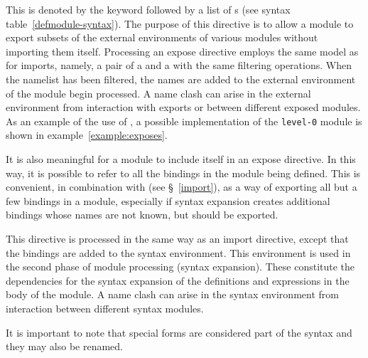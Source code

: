 \begin{optDefinition}
%
This is denoted by the keyword  followed by a list of
s (see syntax table~\ref{defmodule-syntax}).  The
purpose of this directive is to allow a module to export subsets of the external
environments of various modules without importing them itself.  Processing an
expose directive employs the same model as for imports, namely, a pair of a
 and a  with the same filtering operations.
When the namelist has been filtered, the names are added to the external
environment of the module begin processed.  A name clash can arise in the
external environment from interaction with exports or between different exposed
modules.  As an example of the use of , a possible
implementation of the {\tt level-0} module is shown in
example~\ref{example:exposes}.
%
\begin{example}
\label{example:exposes}
\end{example}
%
It is also meaningful for a module to include itself in an expose
directive.  In this way, it is possible to refer to all the bindings
in the module being defined.  This is convenient, in combination with
 (see \S~\ref{import}), as a way of exporting all but
a few bindings in a module, especially if syntax expansion creates
additional bindings whose names are not known, but should be exported.
\end{optDefinition}
%
\label{syntax-directive}
\begin{optDefinition}
This directive is processed in the same way as an import directive,
except that the bindings are added to the syntax environment.  This
environment is used in the second phase of module processing (syntax
expansion).  These constitute the dependencies for the syntax expansion
of the definitions and expressions in the body of the module.  A name
clash can arise in the syntax environment from interaction between
different syntax modules.

It is important to note that special forms are considered part of the
syntax and they may also be renamed.
\end{optDefinition}

